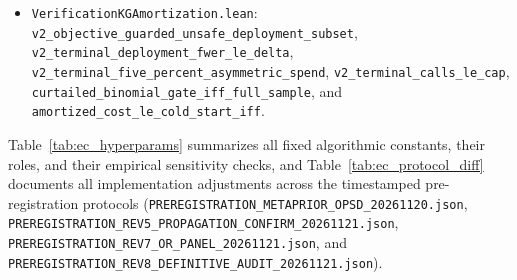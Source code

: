 {\begin{itemize}
  \item \texttt{VerificationKGAmortization.lean}: \texttt{v2\_\allowbreak objective\_\allowbreak guarded\_\allowbreak unsafe\_\allowbreak deployment\_\allowbreak subset}, \texttt{v2\_\allowbreak terminal\_\allowbreak deployment\_\allowbreak fwer\_\allowbreak le\_\allowbreak delta}, \texttt{v2\_\allowbreak terminal\_\allowbreak five\_\allowbreak percent\_\allowbreak asymmetric\_\allowbreak spend}, \texttt{v2\_\allowbreak terminal\_\allowbreak calls\_\allowbreak le\_\allowbreak cap}, \texttt{curtailed\_\allowbreak binomial\_\allowbreak gate\_\allowbreak iff\_\allowbreak full\_\allowbreak sample}, and \texttt{amortized\_\allowbreak cost\_\allowbreak le\_\allowbreak cold\_\allowbreak start\_\allowbreak iff}.
\end{itemize}
}

Table~\ref{tab:ec_hyperparams} summarizes all fixed algorithmic constants, their roles, and their empirical sensitivity checks, and Table~\ref{tab:ec_protocol_diff} documents all implementation adjustments across the timestamped pre-registration protocols (\texttt{PREREGISTRATION\_\allowbreak METAPRIOR\_\allowbreak OPSD\_\allowbreak 20261120.json}, \texttt{PREREGISTRATION\_\allowbreak REV5\_\allowbreak PROPAGATION\_\allowbreak CONFIRM\_\allowbreak 20261121.json}, \texttt{PREREGISTRATION\_\allowbreak REV7\_\allowbreak OR\_\allowbreak PANEL\_\allowbreak 20261121.json}, and \texttt{PREREGISTRATION\_\allowbreak REV8\_\allowbreak DEFINITIVE\_\allowbreak AUDIT\_\allowbreak 20261121.json}).



